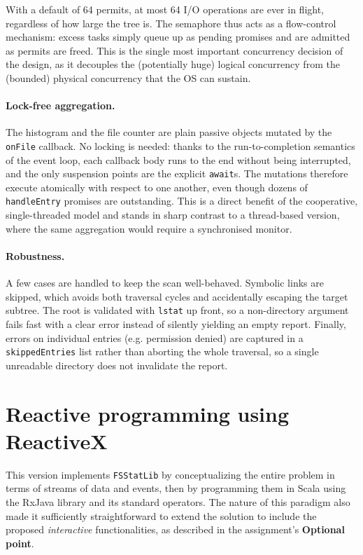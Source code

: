 \documentclass{scrartcl}
\begin{document}
With a default of 64 permits, at most 64 I/O operations are ever in flight, regardless of how large the tree is. The semaphore thus acts as a flow-control mechanism: excess tasks simply queue up as pending promises and are admitted as permits are freed. This is the single most important concurrency decision of the design, as it decouples the (potentially huge) logical concurrency from the (bounded) physical concurrency that the OS can sustain.

\paragraph{Lock-free aggregation.}
The histogram and the file counter are plain passive objects mutated by the \texttt{onFile} callback. No locking is needed: thanks to the run-to-completion semantics of the event loop, each callback body runs to the end without being interrupted, and the only suspension points are the explicit \texttt{await}s. The mutations therefore execute atomically with respect to one another, even though dozens of \texttt{handleEntry} promises are outstanding. This is a direct benefit of the cooperative, single-threaded model and stands in sharp contrast to a thread-based version, where the same aggregation would require a synchronised monitor.

\paragraph{Robustness.}
A few cases are handled to keep the scan well-behaved. Symbolic links are skipped, which avoids both traversal cycles and accidentally escaping the target subtree. The root is validated with \texttt{lstat} up front, so a non-directory argument fails fast with a clear error instead of silently yielding an empty report. Finally, errors on individual entries (e.g. permission denied) are captured in a \texttt{skippedEntries} list rather than aborting the whole traversal, so a single unreadable directory does not invalidate the report.

\section{Reactive programming using ReactiveX}

This version implements \texttt{FSStatLib} by conceptualizing the entire problem in terms of streams of data and events, then by programming them in Scala using the RxJava library and its standard operators. The nature of this paradigm also made it sufficiently straightforward to extend the solution to include the proposed \textit{interactive} functionalities, as described in the assignment's \textbf{Optional point}.
\end{document}
